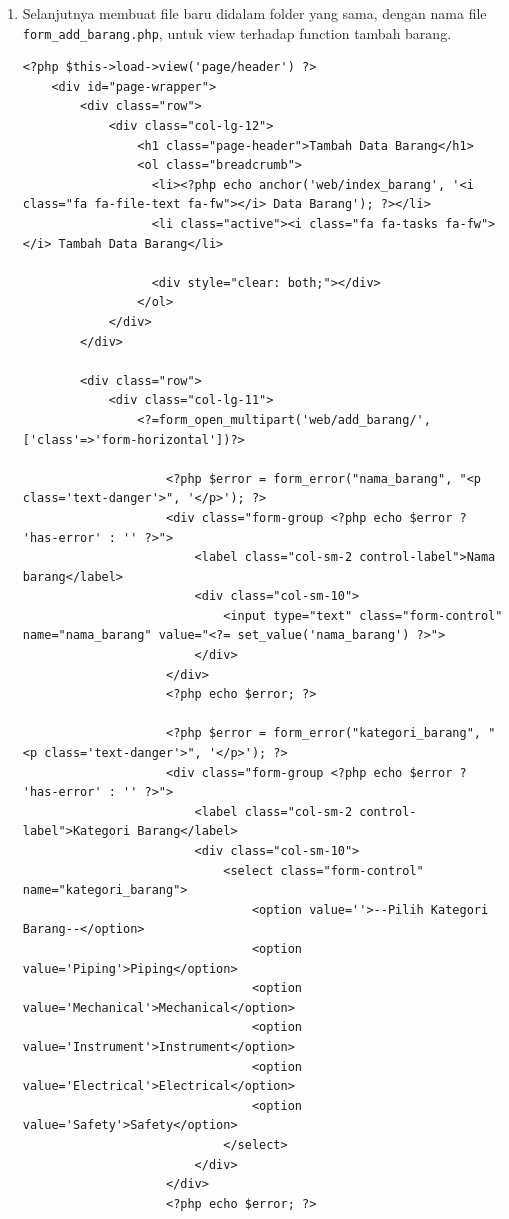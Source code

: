 \begin{enumerate}
\begin{enumerate}
    	\item Selanjutnya membuat file baru didalam folder yang sama, dengan nama file \verb|form_add_barang.php|, untuk view terhadap function tambah barang.
\begin{lstlisting}
<?php $this->load->view('page/header') ?>
    <div id="page-wrapper">
        <div class="row">
            <div class="col-lg-12">
                <h1 class="page-header">Tambah Data Barang</h1>
                <ol class="breadcrumb">
                  <li><?php echo anchor('web/index_barang', '<i class="fa fa-file-text fa-fw"></i> Data Barang'); ?></li>
                  <li class="active"><i class="fa fa-tasks fa-fw"></i> Tambah Data Barang</li>
                  
                  <div style="clear: both;"></div>
                </ol>
            </div>
        </div>

        <div class="row">
            <div class="col-lg-11">
                <?=form_open_multipart('web/add_barang/',['class'=>'form-horizontal'])?>

                    <?php $error = form_error("nama_barang", "<p class='text-danger'>", '</p>'); ?>
                    <div class="form-group <?php echo $error ? 'has-error' : '' ?>">
                        <label class="col-sm-2 control-label">Nama barang</label>
                        <div class="col-sm-10">
                            <input type="text" class="form-control" name="nama_barang" value="<?= set_value('nama_barang') ?>">
                        </div>
                    </div>
                    <?php echo $error; ?>

                    <?php $error = form_error("kategori_barang", "<p class='text-danger'>", '</p>'); ?>
                    <div class="form-group <?php echo $error ? 'has-error' : '' ?>">
                        <label class="col-sm-2 control-label">Kategori Barang</label>
                        <div class="col-sm-10">
                            <select class="form-control" name="kategori_barang">
                                <option value=''>--Pilih Kategori Barang--</option>
                                <option value='Piping'>Piping</option>
                                <option value='Mechanical'>Mechanical</option>
                                <option value='Instrument'>Instrument</option>
                                <option value='Electrical'>Electrical</option>
                                <option value='Safety'>Safety</option>
                            </select>
                        </div>
                    </div>
                    <?php echo $error; ?>


\end{lstlisting}
\end{enumerate}
\end{enumerate}
